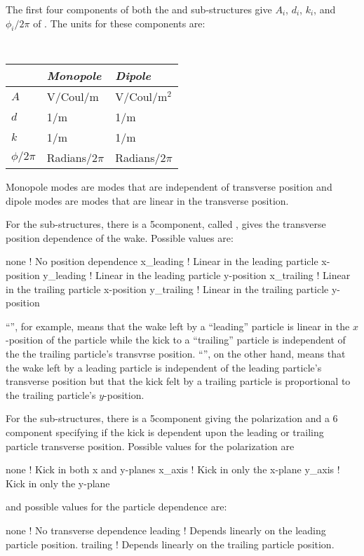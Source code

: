 The first four components of both the  and  sub-structures give
$A_i$, $d_i$, $k_i$, and $\phi_i/2\pi$ of . The units for these components are:
\begin{center} \tt
\begin{tabular}{lll} \toprule
                & {\em Monopole}  & {\em Dipole}     \\ \midrule
  $A$           & V/Coul/m        & V/Coul/m$^2$     \\
  $d$           & 1/m             & 1/m              \\
  $k$           & 1/m             & 1/m              \\
  $\phi/2\pi$   & Radians/2$\pi$  & Radians/2$\pi$   \\ \bottomrule
\end{tabular}
\end{center}
Monopole modes are modes that are independent of transverse position and dipole modes are modes that
are linear in the transverse position. 

For the  sub-structures, there is a 5\Th component, called
, gives the transverse position dependence of the wake. Possible values are:
\begin{example}
  none          ! No position dependence
  x_leading     ! Linear in the leading particle x-position
  y_leading     ! Linear in the leading particle y-position
  x_trailing    ! Linear in the trailing particle x-position
  y_trailing    ! Linear in the trailing particle y-position
\end{example}
``'', for example, means that the wake left by a ``leading'' particle is linear
in the $x$-position of the particle while the kick to a ``trailing'' particle is independent of the
the trailing particle's transvrse position. ``'', on the other hand, means that the 
wake left by a leading particle is independent of the leading particle's transverse position but that
the kick felt by a trailing particle is proportional to the trailing particle's $y$-position.

For the  sub-structures, there is a 5\Th component giving the polarization and a 6\Th
component specifying if the kick is dependent upon the leading or trailing particle transverse position.
Possible values for the polarization are
\begin{example}
  none          ! Kick in both x and y-planes
  x_axis        ! Kick in only the x-plane
  y_axis        ! Kick in only the y-plane
\end{example}
and possible values for the particle dependence are:
\begin{example}
  none          ! No transverse dependence
  leading       ! Depends linearly on the leading particle position.
  trailing      ! Depends linearly on the trailing particle position.
\end{example}

